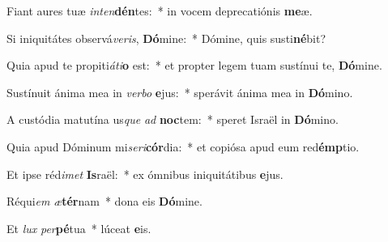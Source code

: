 \item Fiant aures tuæ \textit{in}\textit{ten}\textbf{dén}tes:~* in vocem deprecatiónis \textbf{me}æ.

\item Si iniquitátes observá\textit{ve}\textit{ris}, \textbf{Dó}mine:~* Dómine, quis susti\textbf{né}bit?

\item Quia apud te propiti\textit{á}\textit{ti}\textbf{o} est:~* et propter legem tuam sustínui te, \textbf{Dó}mine.

\item Sustínuit ánima mea in \textit{ver}\textit{bo} \textbf{e}jus:~* sperávit ánima mea in \textbf{Dó}mino.

\item A custódia matutína us\textit{que} \textit{ad} \textbf{noc}tem:~* speret Israël in \textbf{Dó}mino.

\item Quia apud Dóminum mi\textit{se}\textit{ri}\textbf{cór}dia:~* et copiósa apud eum red\textbf{émp}tio.

\item Et ipse réd\textit{i}\textit{met} \textbf{Is}raël:~* ex ómnibus iniquitátibus \textbf{e}jus.

\item Réqui\textit{em} \textit{æ}\textbf{tér}nam~* dona eis \textbf{Dó}mine.

\item Et \textit{lux} \textit{per}\textbf{pé}tua~* lúceat \textbf{e}is.
